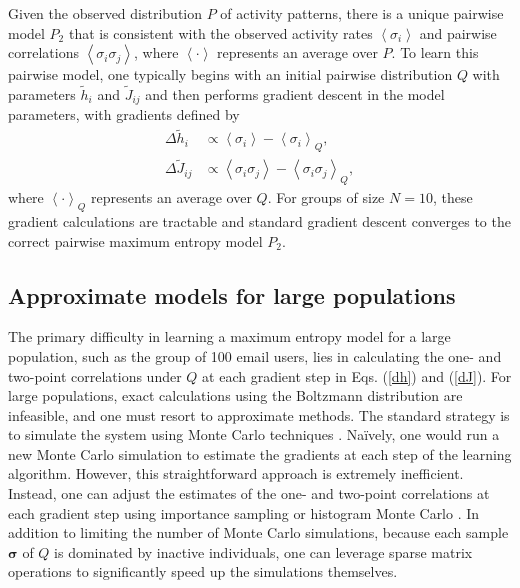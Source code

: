 \documentclass[aps,reprint,superscriptaddress,amsmath,amssymb,longbibliography]{revtex4-1}
\begin{document}
Given the observed distribution $P$ of activity patterns, there is a unique pairwise model $P_2$ that is consistent with the observed activity rates $\left<\sigma_i\right>$ and pairwise correlations $\left<\sigma_i\sigma_j\right>$, where $\left<\cdot\right>$ represents an average over $P$. To learn this pairwise model, one typically begins with an initial pairwise distribution $Q$ with parameters $\tilde{h}_i$ and $\tilde{J}_{ij}$ and then performs gradient descent in the model parameters, with gradients defined by
\begin{align}
\label{dh}
\Delta \tilde{h}_i &\propto \left<\sigma_i\right> - \left<\sigma_i\right>_Q, \\
\label{dJ}
\Delta \tilde{J}_{ij} &\propto \left<\sigma_i\sigma_j\right> - \left<\sigma_i\sigma_j\right>_Q,
\end{align}
where $\left<\cdot\right>_Q$ represents an average over $Q$. For groups of size $N=10$, these gradient calculations are tractable and standard gradient descent converges to the correct pairwise maximum entropy model $P_2$.

\subsection{Approximate models for large populations}

The primary difficulty in learning a maximum entropy model for a large population, such as the group of 100 email users, lies in calculating the one- and two-point correlations under $Q$ at each gradient step in Eqs. (\ref{dh}) and (\ref{dJ}). For large populations, exact calculations using the Boltzmann distribution are infeasible, and one must resort to approximate methods. The standard strategy is to simulate the system using Monte Carlo techniques \cite{Gilks-01,Ganmor-01,Tkacik-02}. Na\"{i}vely, one would run a new Monte Carlo simulation to estimate the gradients at each step of the learning algorithm. However, this straightforward approach is extremely inefficient. Instead, one can adjust the estimates of the one- and two-point correlations at each gradient step using importance sampling \cite{Jordan-01} or histogram Monte Carlo \cite{Ferrenberg-01}. In addition to limiting the number of Monte Carlo simulations, because each sample $\bm{\sigma}$ of $Q$ is dominated by inactive individuals, one can leverage sparse matrix operations to significantly speed up the simulations themselves.
\end{document}
